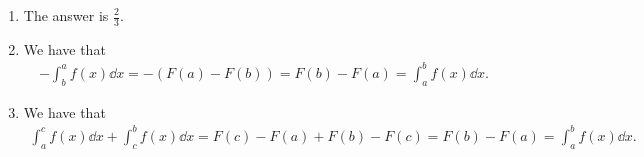 \begin{enumerate}
	
	\item The answer is $\frac{2}{3}$.
	
	\item \label{it:bes3} We have that
	\begin{align*}
	-\int_{b}^{a} f(x) \dd x=-(F(a)-F(b))=F(b)-F(a)=\int_{a}^{b} f(x)\dd x.
	\end{align*}
	
	\item \label{it:best2} We have that
	\begin{align*}
	\int_a^c f(x)\dd x+\int_c^b f(x)\dd x=F(c)-F(a)+F(b)-F(c)=F(b)-F(a)=\int_{a}^{b} f(x)\dd x.
	\end{align*}
	
	
	
\end{enumerate}